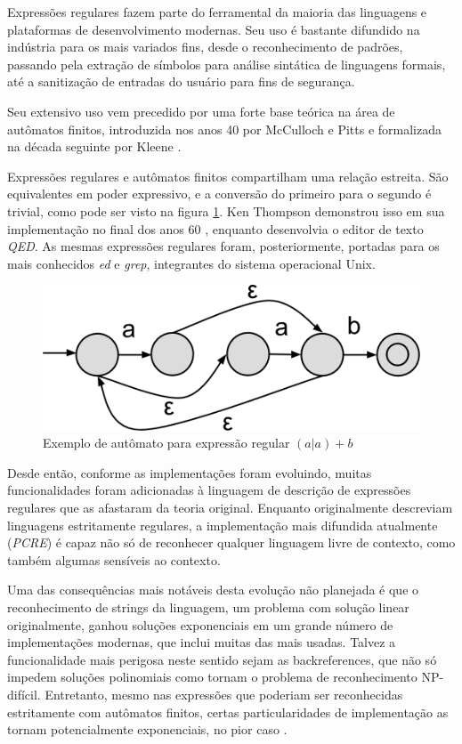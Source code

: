 \documentclass[a4paper,12pt,oneside,onecolumn]{uerj}
\begin{document}
Expressões regulares fazem parte do ferramental da maioria das linguagens e plataformas de desenvolvimento modernas. Seu uso é bastante difundido na indústria para os mais variados fins, desde o reconhecimento de padrões, passando pela extração de símbolos para análise sintática de linguagens formais, até a sanitização de entradas do usuário para fins de segurança.

Seu extensivo uso vem precedido por uma forte base teórica na área de autômatos finitos, introduzida nos anos 40 por McCulloch e Pitts \cite{bib:McCulloch43} e formalizada na década seguinte por Kleene \cite{bib:Kleene56}.

Expressões regulares e autômatos finitos compartilham uma relação estreita. São equivalentes em poder expressivo, e a conversão do primeiro para o segundo é trivial, como pode ser visto na figura \ref{fig:exemplo_automato}. Ken Thompson demonstrou isso em sua implementação no final dos anos 60 \cite{bib:Thompson68}, enquanto desenvolvia o editor de texto \emph{QED}. As mesmas expressões regulares foram, posteriormente, portadas para os mais conhecidos \emph{ed} e \emph{grep}, integrantes do sistema operacional Unix.

\begin{figure}[!htbp]
  \centering
  \includegraphics[scale=0.3]{figures/exemplo_automato.png}
  \caption{Exemplo de autômato para expressão regular $(a|a)+b$}
  \label{fig:exemplo_automato}
\end{figure}

Desde então, conforme as implementações foram evoluindo, muitas funcionalidades foram adicionadas à linguagem de descrição de expressões regulares que as afastaram da teoria original. Enquanto originalmente descreviam linguagens estritamente regulares, a implementação mais difundida atualmente (\emph{PCRE}) é capaz não só de reconhecer qualquer linguagem livre de contexto, como também algumas sensíveis ao contexto. \cite{bib:Nikita12}

Uma das consequências mais notáveis desta evolução não planejada é que o reconhecimento de strings da linguagem, um problema com solução linear originalmente, ganhou soluções exponenciais em um grande número de implementações modernas, que inclui muitas das mais usadas. Talvez a funcionalidade mais perigosa neste sentido sejam as backreferences, que não só impedem soluções polinomiais como tornam o problema de reconhecimento NP-difícil. Entretanto, mesmo nas expressões que poderiam ser reconhecidas estritamente com autômatos finitos, certas particularidades de implementação as tornam potencialmente exponenciais, no pior caso \cite{bib:Cox07}.
\end{document}
